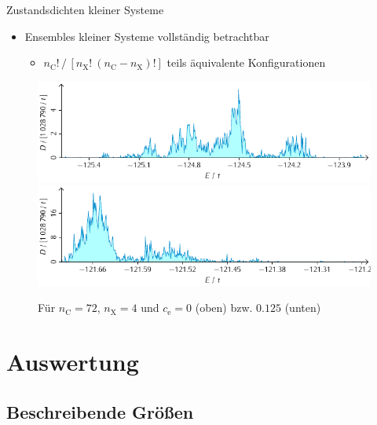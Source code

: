\documentclass{beamer}
\newcommand \bracks[1]{\left [ #1 \right ]}
\def \nC {n_\mathrm{C}}
\def \nX {n_\mathrm{X}}
\def \cE {c_\mathrm{e}}
\begin{document}
	\begin{frame}{Zustandsdichten kleiner Systeme}
		\begin{itemize}
			\item Ensembles kleiner Systeme vollständig betrachtbar
			\begin{itemize}
				\item $\nC! \, / \, \bracks{\nX! \ (\nC - \nX)!}$ teils äquivalente Konfigurationen
			\end{itemize}
		\end{itemize}
		\begin{figure}
			\includegraphics[width=\textwidth]{Abbildungen/75.pdf} \\
			\includegraphics[width=\textwidth]{Abbildungen/84.pdf}
			\caption{Für $\nC = 72$, $\nX = 4$ und $\cE = 0$ (oben) bzw. $0.125$ (unten)}
		\end{figure}
	\end{frame}
	
	\section{Auswertung}
	
	\subsection{Beschreibende Größen}
\end{document}
